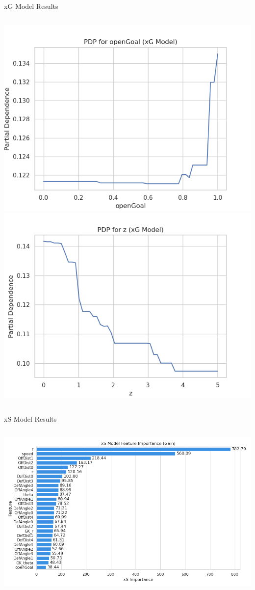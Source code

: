 \documentclass{beamer}
\begin{document}
\begin{frame}{xG Model Results}
\begin{columns}[c]
  \includegraphics[width=\linewidth]{figures/xG_PDP_openGoal.png}
  \includegraphics[width=\linewidth]{figures/xG_PDP_z.png}
\end{columns}
\end{frame}

\begin{frame}{xS Model Results}
\begin{columns}[c]
  \includegraphics[width=\linewidth]{figures/xS_feature_importance.png}
\end{columns}
\end{frame}
\end{document}
